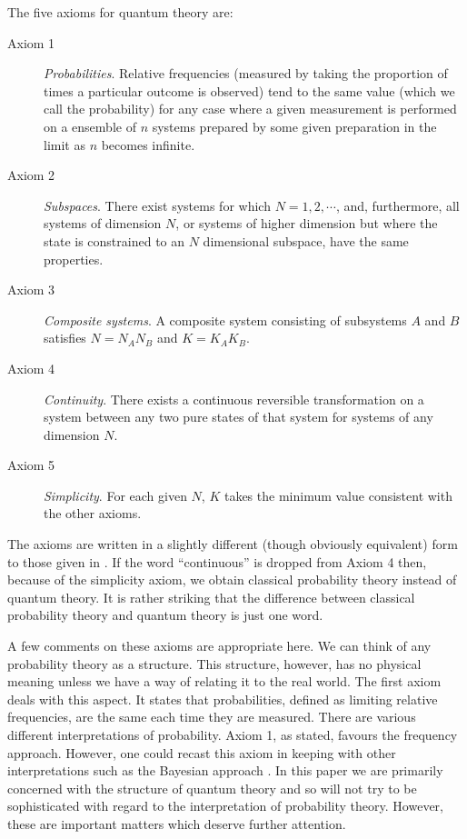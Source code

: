 \documentclass[10pt]{article}
\begin{document}
The five axioms for quantum theory are:
\begin{description}
\item[Axiom 1] {\it Probabilities}.  Relative frequencies (measured by
taking the proportion of times a particular outcome is observed)
tend to the same value (which we call the probability) for any case
where a given measurement is performed on a ensemble of $n$ systems
prepared by some given preparation in the limit as $n$ becomes infinite.
\item[Axiom 2] {\it Subspaces}. There exist systems for which
$N=1,2,\cdots$, and, furthermore, all systems of dimension $N$, or
systems of higher
dimension but where the state is constrained to an $N$ dimensional
subspace, have the same properties.
\item[Axiom 3]  {\it Composite systems}. A composite system consisting of
subsystems $A$ and $B$ satisfies $N=N_AN_B$ and $K=K_AK_B$.
\item[Axiom 4] {\it Continuity}. There exists a continuous reversible
transformation on a system between any two pure states of that
system for systems of any dimension $N$.
\item[Axiom 5] {\it Simplicity}. For each given $N$, $K$ takes the
minimum value consistent with the other axioms.
\end{description}
The axioms are written in a slightly different (though obviously
equivalent) form to those given in \cite{Hardy1}.
If the word ``continuous'' is dropped from Axiom 4 then, because of the
simplicity axiom, we obtain classical probability theory instead of
quantum theory.  It is rather striking that the difference between
classical probability theory and quantum theory is just one word.

A few comments on these axioms are appropriate here.  We can think of
any probability theory as a structure.  This structure, however, has no
physical meaning unless we have a way of relating it to the real world.
The first axiom deals with this aspect.  It states that probabilities,
defined as limiting relative frequencies, are the same each time they
are measured.  There are various different interpretations of
probability.  Axiom 1, as stated, favours the frequency approach.
However, one could recast this axiom in keeping with other
interpretations such as the Bayesian approach \cite{schack}.
In this paper we are
primarily concerned with the structure of quantum theory and so will
not try to be sophisticated with regard to the interpretation of
probability theory.  However, these are important matters which
deserve further attention.
\end{document}
